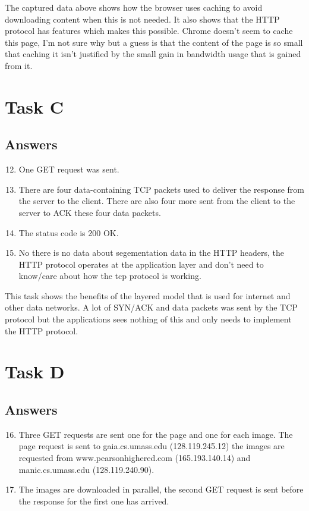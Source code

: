 \documentclass[a4paper,11pt]{article}
\begin{document}
The captured data above shows how the browser uses caching to avoid downloading content when this is not needed. It also shows that the HTTP protocol has features which makes this possible. Chrome doesn't seem to cache this page, I'm not sure why but a guess is that the content of the page is so small that caching it isn't justified by the small gain in bandwidth usage that is gained from it.

\section{Task C}

\subsection{Answers}
\begin{enumerate}
    \setcounter{enumi}{11}
  \item One GET request was sent.
  \item There are four data-containing TCP packets used to deliver the response from the server to the client. There are also four more sent from the client to the server to ACK these four data packets.
  \item The status code is 200 OK.
  \item No there is no data about segementation data in the HTTP headers, the HTTP protocol operates at the application layer and don't need to know/care about how the tcp protocol is working.
\end{enumerate}

This task shows the benefits of the layered model that is used for internet and other data networks. 
A lot of SYN/ACK and data packets was sent by the TCP protocol but the applications sees nothing of this and only needs to implement the HTTP protocol.

\section{Task D}

\subsection{Answers}
\begin{enumerate}
    \setcounter{enumi}{15}
  \item Three GET requests are sent one for the page and one for each image. 
    The page request is sent to gaia.cs.umass.edu (128.119.245.12) the images are requested from www.pearsonhighered.com (165.193.140.14) and manic.cs.umass.edu (128.119.240.90).
  \item The images are downloaded in parallel, the second GET request is sent before the response for the first one has arrived.
\end{enumerate}
\end{document}
